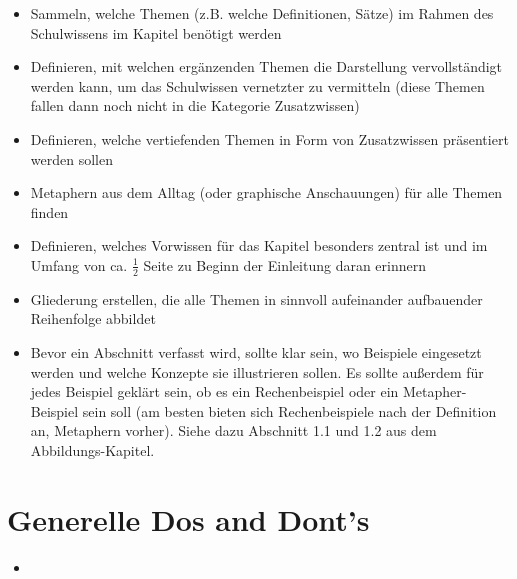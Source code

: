 \documentclass{article}
\begin{document}
\begin{itemize}[leftmargin=.5cm]
	\item Sammeln, welche Themen (z.B. welche Definitionen, Sätze) im Rahmen des Schulwissens im Kapitel benötigt werden
	\item Definieren, mit welchen ergänzenden Themen die Darstellung vervollständigt werden kann, um das Schulwissen vernetzter zu vermitteln (diese Themen fallen dann noch nicht in die Kategorie Zusatzwissen)
	\item Definieren, welche vertiefenden Themen in Form von Zusatzwissen präsentiert werden sollen
	\item Metaphern aus dem Alltag (oder graphische Anschauungen) für alle Themen finden
	\item Definieren, welches Vorwissen für das Kapitel besonders zentral ist und im Umfang von ca. $\frac{1}{2}$ Seite zu Beginn der Einleitung daran erinnern
	\item Gliederung erstellen, die alle Themen in sinnvoll aufeinander aufbauender Reihenfolge abbildet
	\item Bevor ein Abschnitt verfasst wird, sollte klar sein, wo Beispiele eingesetzt werden und welche Konzepte sie illustrieren sollen. Es sollte außerdem für jedes Beispiel geklärt sein, ob es ein Rechenbeispiel oder ein Metapher-Beispiel sein soll (am besten bieten sich Rechenbeispiele nach der Definition an, Metaphern vorher). Siehe dazu Abschnitt 1.1 und 1.2 aus dem Abbildungs-Kapitel.
\end{itemize}

\section*{Generelle Dos and Dont's}
\begin{itemize}[leftmargin=.5cm]
    \item 
\end{itemize}
\end{document}

